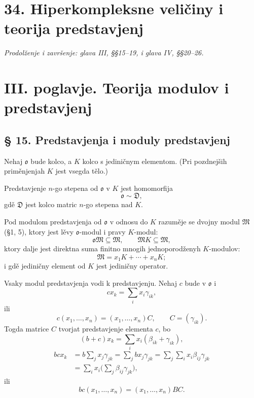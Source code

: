 \documentclass[11pt]{article}
\providecommand{\mo}{\mathfrak{o}}
\providecommand{\mM}{\mathfrak{M}}
\begin{document}
\section*{34. Hiperkompleksne veličiny i teorija predstavjenj}
\emph{Prodolženje i završenje: glava III, §§15--19, i glava IV, §§20--26.}

\section*{III. poglavje. Teorija modulov i predstavjenj}

\subsection*{§ 15. Predstavjenja i moduly predstavjenj}

Nehaj $\mo$ bude kolco, a $K$ kolco s jediničnym elementom. (Pri pozdnejših priměnjenjah $K$ jest vsegda tělo.)

Predstavjenje $n$-go stepena od $\mo$ v $K$ jest homomorfija
\[
        \mo\sim\mathfrak D,
\]
gdě $\mathfrak D$ jest kolco matric $n$-go stepena nad $K$.

Pod modulom predstavjenja od $\mo$ v odnosu do $K$ razuměje se dvojny modul $\mM$ (§1, 5), ktory jest lěvy $\mo$-modul i pravy $K$-modul:
\[
        \mo\mM\subseteq\mM,
        \qquad
        \mM K\subseteq\mM,
\]
ktory dalje jest direktna suma finitno mnogih jednoporodženyh $K$-modulov:
\[
        \mM=x_1K+\cdots+x_nK;
\]
i gdě jediničny element od $K$ jest jediničny operator.

Vsaky modul predstavjenja vodi k predstavjenju. Nehaj $c$ bude v $\mo$ i
\[
        cx_k=\sum_i x_i\gamma_{ik},
\]
ili
\[
        c(x_1,\ldots,x_n)=(x_1,\ldots,x_n)C,
        \qquad C=(\gamma_{ik}).
\]
Togda matrice $C$ tvorjat predstavjenje elementa $c$, bo
\[
        (b+c)x_k=\sum_i x_i(\beta_{ik}+\gamma_{ik}),
\]
\[
\begin{aligned}
        bcx_k
        &=b\sum_jx_j\gamma_{jk}
          =\sum_j b x_j\gamma_{jk}
          =\sum_j\sum_i x_i\beta_{ij}\gamma_{jk}  \\
        &=\sum_i x_i\biggl(\sum_j\beta_{ij}\gamma_{jk}\biggr),
\end{aligned}
\]
ili
\[
        bc(x_1,\ldots,x_n)=(x_1,\ldots,x_n)BC.
\]
\end{document}
